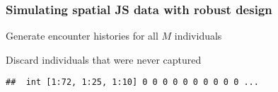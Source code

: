 \documentclass[color=usenames,dvipsnames]{beamer}
\begin{document}
\begin{frame}[fragile]
  \frametitle{Simulating spatial JS data with robust design}
{Generate encounter histories for all $M$ individuals}
\begin{knitrout}\footnotesize
{}\color{fgcolor}\begin{kframe}
\begin{alltt}
 \hlkwb{<-} \hlstd{(}\hlstd{,}    
 \hlkwb{<-} \hlstd{(}\hlstd{,}            
  \hlopt{:}
      \hlopt{:}
          \hlopt{:}
            \hlstd{yall.bern[i,j,}\hlopt{:}\hlstd{K,t]} \hlkwb{<-}  \hlopt{*}
             \hlkwb{<-} \hlstd{(}\hlopt{*}
        \hlstd{\}}
    \hlstd{\}}
\hlstd{\}}
\end{alltt}
\end{kframe}
\end{knitrout}
\pause
\vfill
{\normalsize Discard individuals that were never captured}
\begin{knitrout}\footnotesize
{}\color{fgcolor}\begin{kframe}
\begin{alltt}
 \hlkwb{<-} \hlstd{yall.bern[}\hlopt{>}\hlstd{,,,]}
 \hlkwb{<-} \hlstd{yall[}\hlopt{>}\hlstd{,,]}
\end{alltt}
\begin{verbatim}
##  int [1:72, 1:25, 1:10] 0 0 0 0 0 0 0 0 0 0 ...
\end{verbatim}
\end{kframe}
\end{knitrout}
\end{frame}






\end{document}
